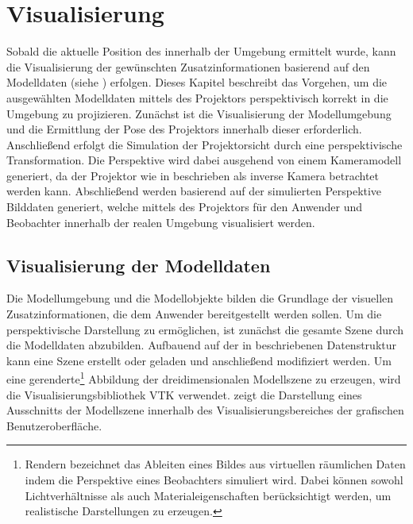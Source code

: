 \chapter{Visualisierung}
\label{chap.vis}

\prever{
}

Sobald die aktuelle Position des  innerhalb der Umgebung ermittelt wurde, kann die Visualisierung der gewünschten Zusatzinformationen basierend auf den Modelldaten (siehe ) erfolgen. Dieses Kapitel beschreibt das Vorgehen, um die ausgewählten Modelldaten mittels des Projektors perspektivisch korrekt in die Umgebung zu projizieren. Zunächst ist die Visualisierung der Modellumgebung und die Ermittlung der Pose des Projektors innerhalb dieser erforderlich. Anschließend erfolgt die Simulation der Projektorsicht durch eine perspektivische Transformation. Die Perspektive wird dabei ausgehend von einem Kameramodell generiert, da der Projektor wie in  beschrieben als inverse Kamera betrachtet werden kann. Abschließend werden basierend auf der simulierten Perspektive Bilddaten generiert, welche mittels des Projektors für den Anwender und Beobachter innerhalb der realen Umgebung visualisiert werden.

\section{Visualisierung der Modelldaten}
Die Modellumgebung und die Modellobjekte bilden die Grundlage der visuellen Zusatzinformationen, die dem Anwender bereitgestellt werden sollen. Um die perspektivische Darstellung zu ermöglichen, ist zunächst die gesamte Szene durch die Modelldaten abzubilden. Aufbauend auf der in  beschriebenen Datenstruktur kann eine Szene erstellt oder geladen und anschließend modifiziert werden. Um eine gerenderte\footnote{Rendern bezeichnet das Ableiten eines Bildes aus virtuellen räumlichen Daten indem die Perspektive eines Beobachters simuliert wird. Dabei können sowohl Lichtverhältnisse als auch Materialeigenschaften berücksichtigt werden, um realistische Darstellungen zu erzeugen.} Abbildung der dreidimensionalen Modellszene zu erzeugen, wird die Visualisierungsbibliothek VTK verwendet.  zeigt die Darstellung eines Ausschnitts der Modellszene innerhalb des Visualisierungsbereiches der grafischen Benutzeroberfläche.\\

